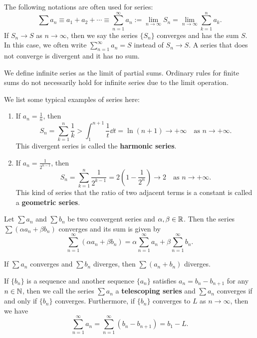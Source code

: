     \begin{notationenv}
        The following notations are often used for series:
        \[
        \sum a_n \equiv a_1 + a_2 + \cdots \equiv \sum_{n=1}^\infty a_n := \lim_{n\to \infty} S_n = \lim_{n\to \infty} \sum_{k=1}^n a_k.
        \]
        If $S_n \to S$ as $n\to \infty$, then we say the series $\{S_n\}$ converges and has the sum $S$. In this case, we often write $\displaystyle \sum_{n=1}^\infty a_n = S$ instead of $S_n \to S$. A series that does not converge is divergent and it has no sum.
    \end{notationenv}
    \begin{remarkenv}
        We define infinite series as the limit of partial sums. Ordinary rules for finite sums do not necessarily hold for infinite series due to the limit operation.
    \end{remarkenv}
    \begin{exampleenv}
        We list some typical examples of series here:
        \begin{enumerate}
            \item If $\displaystyle a_n = \frac{1}{n}$, then
            \[
            S_n = \sum_{k=1}^n \frac{1}{k} > \int_1^{n+1} \frac{1}{t} \dd t = \ln(n+1) \to +\infty \quad \text{as } n\to +\infty.
            \]
            This divergent series is called the \textbf{harmonic series}.
            \item If $\displaystyle a_n = \frac{1}{2^{n-1}}$, then
            \[
            S_n = \sum_{k=1}^n \frac{1}{2^{k-1}} = 2\left( 1 - \frac{1}{2^n} \right) \to 2 \quad \text{as } n\to +\infty.
            \]
            This kind of series that the ratio of two adjacent terms is a constant is called a \textbf{geometric series}.
        \end{enumerate}
    \end{exampleenv}
    \begin{theoremenv}
        Let $\sum a_n$ and $\sum b_n$ be two convergent series and $\alpha,\beta \in \mathbb{R}$. Then the series $\sum (\alpha a_n + \beta b_n)$ converges and its sum is given by
        \[
        \sum_{n=1}^\infty (\alpha a_n + \beta b_n) = \alpha \sum_{n=1}^\infty a_n + \beta \sum_{n=1}^\infty b_n.
        \]
    \end{theoremenv}
    \begin{corollaryenv}
        If $\sum a_n$ converges and $\sum b_n$ diverges, then $\sum (a_n + b_n)$ diverges.
    \end{corollaryenv}
    \begin{theoremenv}
        If $\{b_n\}$ is a sequence and another sequence $\{a_n\}$ satisfies $a_n = b_n - b_{n+1}$ for any $n\in \mathbb{N}$, then we call the series $\sum a_n$ a \textbf{telescoping series} and $\sum a_n$ converges if and only if $\{b_n\}$ converges. Furthermore, if $\{b_n\}$ converges to $L$ as $n\to \infty$, then we have
        \[
        \sum_{n=1}^\infty a_n = \sum_{n=1}^\infty (b_n - b_{n+1}) =  b_1 - L.
        \]
    \end{theoremenv}
